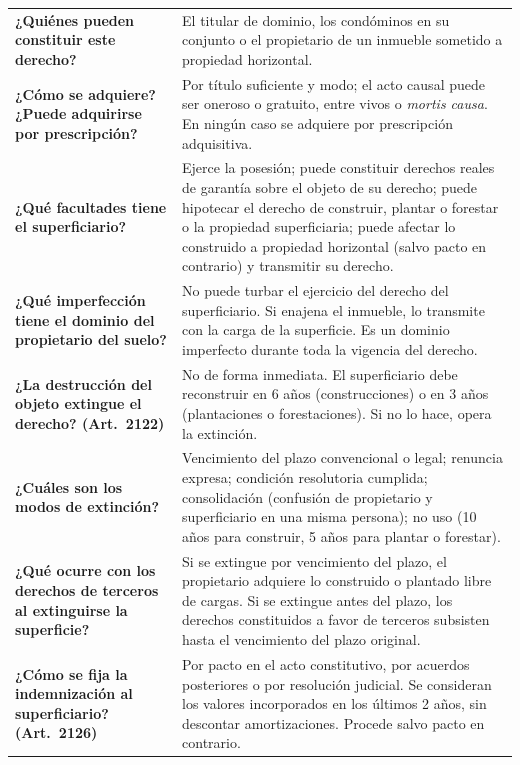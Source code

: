 \documentclass[12pt,oneside]{book}
\begin{document}
\begin{longtable}{
    >{\raggedright\arraybackslash}p{}
    >{\raggedright\arraybackslash}p{}
}
\textbf{¿Quiénes pueden constituir este derecho?} &
El titular de dominio, los condóminos en su conjunto o el propietario de un inmueble sometido a propiedad horizontal. \\[0.6em]

\textbf{¿Cómo se adquiere? ¿Puede adquirirse por prescripción?} &
Por título suficiente y modo; el acto causal puede ser oneroso o gratuito, entre vivos o \textit{mortis causa}. En ningún caso se adquiere por prescripción adquisitiva. \\[0.6em]

\textbf{¿Qué facultades tiene el superficiario?} &
Ejerce la posesión; puede constituir derechos reales de garantía sobre el objeto de su derecho; puede hipotecar el derecho de construir, plantar o forestar o la propiedad superficiaria; puede afectar lo construido a propiedad horizontal (salvo pacto en contrario) y transmitir su derecho. \\[0.6em]

\textbf{¿Qué imperfección tiene el dominio del propietario del suelo?} &
No puede turbar el ejercicio del derecho del superficiario. Si enajena el inmueble, lo transmite con la carga de la superficie. Es un dominio imperfecto durante toda la vigencia del derecho. \\[0.6em]

\textbf{¿La destrucción del objeto extingue el derecho? (Art.~2122)} &
No de forma inmediata. El superficiario debe reconstruir en 6 años (construcciones) o en 3 años (plantaciones o forestaciones). Si no lo hace, opera la extinción. \\[0.6em]

\textbf{¿Cuáles son los modos de extinción?} &
Vencimiento del plazo convencional o legal; renuncia expresa; condición resolutoria cumplida; consolidación (confusión de propietario y superficiario en una misma persona); no uso (10 años para construir, 5 años para plantar o forestar). \\[0.6em]

\textbf{¿Qué ocurre con los derechos de terceros al extinguirse la superficie?} &
Si se extingue por vencimiento del plazo, el propietario adquiere lo construido o plantado libre de cargas. Si se extingue antes del plazo, los derechos constituidos a favor de terceros subsisten hasta el vencimiento del plazo original. \\[0.6em]

\textbf{¿Cómo se fija la indemnización al superficiario? (Art.~2126)} &
Por pacto en el acto constitutivo, por acuerdos posteriores o por resolución judicial. Se consideran los valores incorporados en los últimos 2 años, sin descontar amortizaciones. Procede salvo pacto en contrario. \\[0.6em]


\end{longtable}
\end{document}
